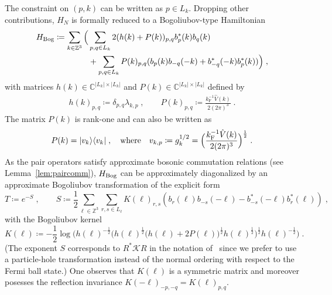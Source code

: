 \documentclass[12pt,a4paper]{article}
\numberwithin{equation}{section}
\newcommand{\cK}{\mathcal{K}}
\newcommand{\CCC}{\mathbb{C}}
\newcommand{\1}{\mathbb{I}}
\newcommand{\Bog}{\textnormal{Bog}}
\newcommand{\F}{\mathrm{F}}
\newcommand{\Zstar}{\mathbb{Z}^3} %
\newcommand{\Z}{\mathbb{Z}}
\newcommand{\half}{\frac{1}{2}}
\theoremstyle{plain}
\theoremstyle{definition}
\theoremstyle{remark}
\theoremstyle{plain}
\theoremstyle{definition}
\theoremstyle{remark}
\begin{document}
The constraint on $ (p,k) $ can be written as $ p \in L_k $.
Dropping other contributions, $ H_N $ is formally reduced to a Bogoliubov-type Hamiltonian~\cite[(1.34)]{CHN23}
\begin{equation} \label{eq:HBog}
\begin{split}
	H_{\Bog}
	\coloneq \sum_{k \in \Zstar} \Big( & \sum_{p,q \in L_k} 2 (h(k) + P(k))_{p,q} b^*_p(k) b_q(k) \\
	& 		+ \sum_{p,q \in L_k} P(k)_{p,q} (b_p(k) b_{-q}(-k) + b^*_{-q}(-k) b^*_p(k)) \Big) \;,
\end{split}
\end{equation}
with matrices $ h(k) \in \CCC^{|L_k| \times |L_k|}$ and $P(k) \in \CCC^{|L_k| \times |L_k|} $ defined by
\begin{equation} \label{eq:HkPk}
\begin{aligned}
	h(k)_{p,q} \coloneq \delta_{p,q} \lambda_{k,p} \;, \qquad
	P(k)_{p,q} \coloneq \frac{k_{\F}^{-1}\hat{V}(k) }{2 (2 \pi)^3} \;.
\end{aligned}
\end{equation}
The matrix $ P(k) $ is rank-one and can also be written as
\begin{equation}P(k) = \lvert v_k \rangle \langle v_k \rvert \;, \quad \textnormal{where} \quad v_{k,p} \coloneq g_k^{1/2} = \Big( \frac{k_{\F}^{-1} \hat{V}(k) }{2 (2 \pi)^3} \Big)^\half \;.
\end{equation}
 As the pair operators satisfy approximate bosonic commutation relations (see Lemma~\ref{lem:paircomm}), $ H_{\Bog} $ can be approximately diagonalized by an approximate Bogoliubov transformation \cite[Thm.~1.4]{CHN23} of the explicit form
\begin{equation} \label{eq:T}
	T \coloneq e^{-S} \;, \qquad
	S \coloneq \frac{1}{2}\sum_{\ell\in \Zstar}\sum_{r,s\in L_\ell}K(\ell)_{r,s}\left(b_r(\ell)b_{-s}(-\ell)-b^*_{-s}(-\ell)b^*_{r}(\ell)\right) \;,
\end{equation}
with the Bogoliubov kernel
\begin{equation} \label{eq:K}
	K(\ell) \coloneq - \half \log \Big( h(\ell)^{-\half}
		\big( h(\ell)^{\half} \big( h(\ell) + 2 P(\ell) \big)^{\half} h(\ell)^{\half}\big)^{\half}
		h(\ell)^{-\half} \Big) \;.
\end{equation}
(The exponent $ S $ corresponds to $ R^* \cK R $ in the notation of~\cite{CHN23} since we prefer to use a particle-hole transformation instead of the normal ordering with respect to the Fermi ball state.)
One observes that $K(\ell)$ is a symmetric matrix and moreover posesses the reflection invariance $ K(-\ell)_{-p,-q} = K(\ell)_{p,q} $.
\end{document}
